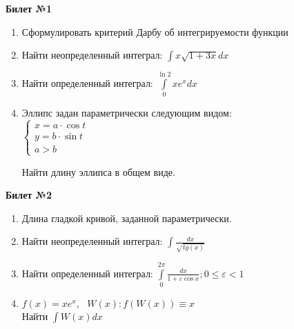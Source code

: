 \documentclass[a4paper, 12pt]{article}
\begin{document}
\begin{center}
    \textbf{Билет №1}
\end{center}
\begin{enumerate}
\item Сформулировать критерий Дарбу об интегрируемости функции
\item Найти неопределенный интеграл: $ \displaystyle \int{x\sqrt{1+3x}}dx$
\item Найти определенный интеграл: $\displaystyle \int\limits_{0}^{\ln{2}}{xe^xdx}$
\item Эллипс задан параметрически следующим видом: \\ 

$
	\begin{cases}
		x = a\cdot\cos{t} \\
		y=b\cdot\sin{t} \\
		a > b
		
	\end{cases}
$

Найти длину эллипса в общем виде.

\end{enumerate}

\begin{center}
	\textbf{Билет №2}
\end{center}
\begin{enumerate}
	\item Длина гладкой кривой, заданной параметрически.
	\item Найти неопределенный интеграл: $\displaystyle \int{\frac{dx}{\sqrt{tg(x)}}}$
	\item Найти определенный интеграл: $\displaystyle \int\limits_{0}^{2\pi}{\frac{dx}{1+\varepsilon \cos{x}}; 0 \le \varepsilon < 1}$
	\item $f(x) = xe^x,\ \ \ W(x): f(W(x)) \equiv x$ \\ Найти $\displaystyle \int{W(x)dx}$
	
\end{enumerate}
\end{document}
